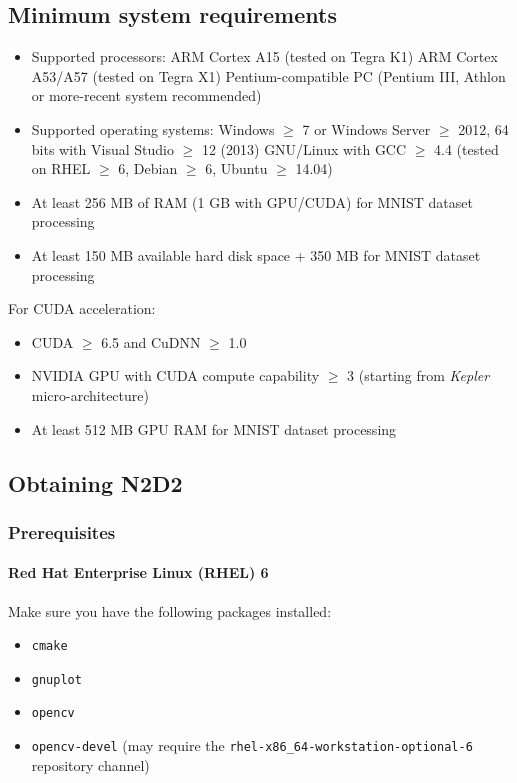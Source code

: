 \documentclass[a4paper,11pt,oneside]{article}
\newenvironment{myitemize}
{ \begin{itemize}
    \setlength{\itemsep}{0pt}
    \setlength{\parskip}{0pt}
    \setlength{\parsep}{0pt}     }
{ \end{itemize}                  }
\begin{document}
\subsection{Minimum system requirements}

\begin{myitemize}
    \item Supported processors:
        \subitem ARM Cortex A15 (tested on Tegra K1)
        \subitem ARM Cortex A53/A57 (tested on Tegra X1)
        \subitem Pentium-compatible PC (Pentium III, Athlon or more-recent system recommended)
    \item Supported operating systems:
        \subitem Windows $\geq$ 7 or Windows Server $\geq$ 2012, 64 bits with Visual Studio $\geq$ 12 (2013)
        \subitem GNU/Linux with GCC $\geq$ 4.4 (tested on RHEL $\geq$ 6, Debian $\geq$ 6, Ubuntu $\geq$ 14.04)
    \item At least 256 MB of RAM (1 GB with GPU/CUDA) for MNIST dataset processing
    \item At least 150 MB available hard disk space + 350 MB for MNIST dataset processing
\end{myitemize}

For CUDA acceleration:

\begin{myitemize}
    \item CUDA $\geq$ 6.5 and CuDNN $\geq$ 1.0
    \item NVIDIA GPU with CUDA compute capability $\geq$ 3 (starting from \emph{Kepler} micro-architecture)
    \item At least 512 MB GPU RAM for MNIST dataset processing
\end{myitemize}


\subsection{Obtaining N2D2}

\subsubsection{Prerequisites}

\paragraph{Red Hat Enterprise Linux (RHEL) 6}

Make sure you have the following packages installed:
\begin{myitemize}
    \item \lstinline!cmake!
    \item \lstinline!gnuplot!
    \item \lstinline!opencv!
    \item \lstinline!opencv-devel! (may require the
    \lstinline!rhel-x86_64-workstation-optional-6! repository channel)
\end{myitemize}
\end{document}
